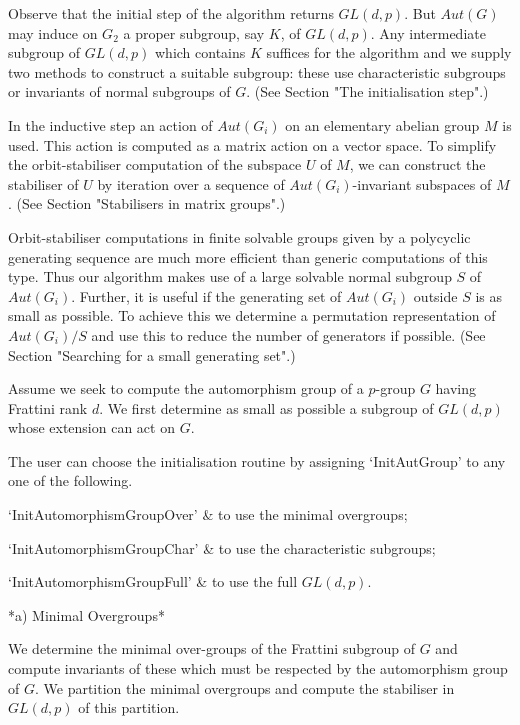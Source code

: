 Observe that the initial step of the algorithm returns $GL(d,p)$. But 
$Aut(G)$ may induce on $G_2$ a proper subgroup, say $K$, of $GL(d,p)$.
Any intermediate subgroup of $GL(d,p)$ which contains $K$ suffices for
the algorithm and we supply two methods to construct a suitable subgroup:
these use characteristic subgroups or invariants of normal subgroups of $G$. 
(See Section "The initialisation step".)

In the inductive step an action of $Aut(G_i)$ on an elementary abelian 
group $M$ is used. This action is computed as a matrix action on a vector 
space. To simplify the orbit-stabiliser computation of the subspace $U$ 
of $M$, we can construct the stabiliser of $U$ by iteration over a sequence 
of $Aut(G_i)$-invariant subspaces of $M$. 
(See Section "Stabilisers in matrix groups".)

Orbit-stabiliser computations in finite solvable groups given by a
polycyclic generating sequence are much more efficient than generic
computations of this type. Thus our algorithm makes use of a large 
solvable normal subgroup $S$ of $Aut(G_i)$. Further, it is useful if
the generating set of $Aut(G_i)$ outside $S$ is as small as possible. 
To achieve this we determine a permutation representation of $Aut(G_i)/S$ 
and use this to reduce the number of generators if possible. (See Section 
"Searching for a small generating set".)


Assume  we seek to  compute the  automorphism group of a  $p$-group $G$
having Frattini rank  $d$.  We first determine as small as possible a
subgroup of $GL(d, p)$ whose extension can act on $G$. 

The user can choose the initialisation routine by assigning 
`InitAutGroup' to any one of the following.

\beginitems
`InitAutomorphismGroupOver' & to use the minimal overgroups;

`InitAutomorphismGroupChar' & to use the characteristic subgroups;

`InitAutomorphismGroupFull' & to use the full $GL(d,p)$.
\enditems

*a) Minimal Overgroups*

We  determine the  minimal over-groups  of the Frattini subgroup of 
$G$ and compute invariants of these which must be respected by the 
automorphism group  of $G$. We partition the minimal overgroups and 
compute the stabiliser in $GL(d, p)$ of this partition.

